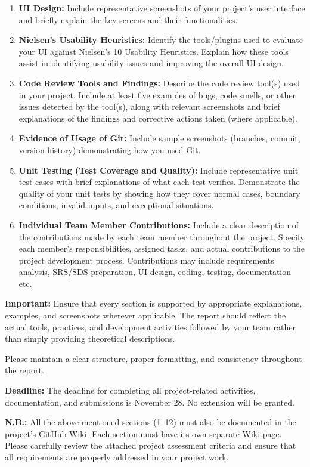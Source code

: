 \documentclass[11pt,a4paper]{article}
\begin{document}
\begin{enumerate}
    \item \textbf{UI Design:} Include representative screenshots of your project's user interface and briefly explain the key screens and their functionalities.

    \item \textbf{Nielsen's Usability Heuristics:} Identify the tools/plugins used to evaluate your UI against Nielsen's 10 Usability Heuristics. Explain how these tools assist in identifying usability issues and improving the overall UI design.

    \item \textbf{Code Review Tools and Findings:} Describe the code review tool(s) used in your project. Include at least five examples of bugs, code smells, or other issues detected by the tool(s), along with relevant screenshots and brief explanations of the findings and corrective actions taken (where applicable).

    \item \textbf{Evidence of Usage of Git:} Include sample screenshots (branches, commit, version history) demonstrating how you used Git.

    \item \textbf{Unit Testing (Test Coverage and Quality):} Include representative unit test cases with brief explanations of what each test verifies. Demonstrate the quality of your unit tests by showing how they cover normal cases, boundary conditions, invalid inputs, and exceptional situations.

    \item \textbf{Individual Team Member Contributions:} Include a clear description of the contributions made by each team member throughout the project. Specify each member's responsibilities, assigned tasks, and actual contributions to the project development process. Contributions may include requirements analysis, SRS/SDS preparation, UI design, coding, testing, documentation etc.
\end{enumerate}

\medskip

\noindent\textbf{Important:} Ensure that every section is supported by appropriate explanations, examples, and screenshots wherever applicable. The report should reflect the actual tools, practices, and development activities followed by your team rather than simply providing theoretical descriptions.

\medskip

Please maintain a clear structure, proper formatting, and consistency throughout the report.

\medskip

\noindent\textbf{Deadline:} The deadline for completing all project-related activities, documentation, and submissions is November 28. No extension will be granted.

\medskip

\noindent\textbf{N.B.:} All the above-mentioned sections (1--12) must also be documented in the project's GitHub Wiki. Each section must have its own separate Wiki page. Please carefully review the attached project assessment criteria and ensure that all requirements are properly addressed in your project work.
\end{document}
